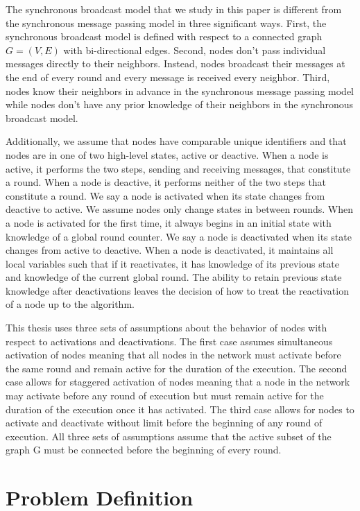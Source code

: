 \documentclass[english]{article}
\begin{document}
The synchronous broadcast model that we study in this paper is different from the synchronous message passing model in three significant ways. First, the synchronous broadcast model is defined with respect to a connected graph $G=(V,E)$ with bi-directional edges. Second, nodes don't pass individual messages directly to their neighbors. Instead, nodes broadcast their messages at the end of every round and every message is received every neighbor. Third, nodes know their neighbors in advance in the synchronous message passing model while nodes don't have any prior knowledge of their neighbors in the synchronous broadcast model.

Additionally, we assume that nodes have comparable unique identifiers and that nodes are in one of two high-level states, active or deactive. When a node is active, it performs the two steps, sending and receiving messages, that constitute a round. When a node is deactive, it performs neither of the two steps that constitute a round. We say a node is activated when its state changes from deactive to active. We assume nodes only change states in between rounds. When a node is activated for the first time, it always begins in an initial state with knowledge of a global round counter. We say a node is deactivated when its state changes from active to deactive. When a node is deactivated, it maintains all local variables such that if it reactivates, it has knowledge of its previous state and knowledge of the current global round. The ability to retain previous state knowledge after deactivations leaves the decision of how to treat the reactivation of a node up to the algorithm.

This thesis uses three sets of assumptions about the behavior of nodes with respect to activations and deactivations. The first case assumes simultaneous activation of nodes meaning that all nodes in the network must activate before the same round and remain active for the duration of the execution. The second case allows for staggered activation of nodes meaning that a node in the network may activate before any round of execution but must remain active for the duration of the execution once it has activated. The third case allows for nodes to activate and deactivate without limit before the beginning of any round of execution. All three sets of assumptions assume that the active subset of the graph G must be connected before the beginning of every round.

\section{Problem Definition}
\end{document}
